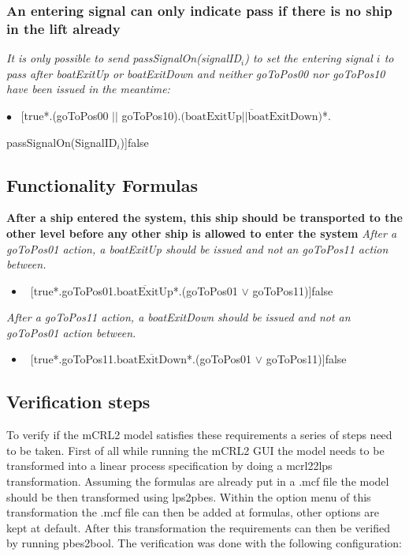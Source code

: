 \subsubsection{An entering signal can only indicate pass if there is no ship in the lift already}
\textit{It is only possible to send passSignalOn(signalID$_i$) to set the entering signal $i$ to pass after boatExitUp or boatExitDown and neither goToPos00 nor goToPos10 have been issued in the meantime:}\vspace{0.3cm}

	$\bullet$ ~[true*.(goToPos00 $||$ goToPos10).$\overline{\textrm{(boatExitUp} || \textrm{boatExitDown)}}$*.
		\begin{flushright}
			passSignalOn(SignalID$_i$)]false
		\end{flushright}
		
\subsection{Functionality Formulas}
\textbf{After a ship entered the system, this ship should be transported to the other level before any other ship is allowed to enter the system}
\textit{After a goToPos01 action, a boatExitUp should be issued and not an goToPos11 action between.}

\begin{itemize}
	\item ~[true*.goToPos01.$\overline{\textrm{boatExitUp}}$*.(goToPos01 $\vee$ goToPos11)]false
\end{itemize}

\noindent\textit{After a goToPos11 action, a boatExitDown should be issued and not an goToPos01 action between.}

\begin{itemize}
	\item ~[true*.goToPos11.$\overline{\textrm{boatExitDown}}$*.(goToPos01 $\vee$ goToPos11)]false
\end{itemize}

\subsection{Verification steps}
To verify if the mCRL2 model satisfies these requirements a series of steps need to be taken. First of all while running the mCRL2 GUI the model needs to be transformed into a linear process specification by doing a mcrl22lps transformation. Assuming the formulas are already put in a .mcf file the model should be then transformed using lps2pbes. Within the option menu of this transformation the .mcf file can then be added at formulas, other options are kept at default. After this transformation the requirements can then be verified by running pbes2bool. The verification was done with the following configuration:

